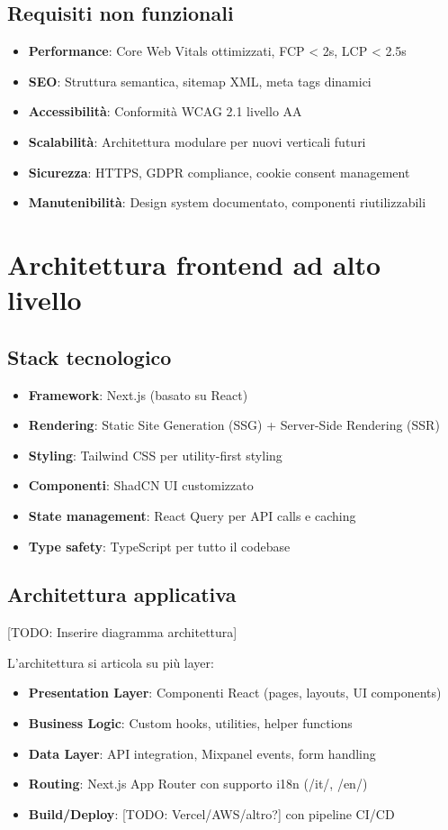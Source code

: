 \subsection{Requisiti non funzionali}
\begin{itemize}
  \item \textbf{Performance}: Core Web Vitals ottimizzati, FCP < 2s, LCP < 2.5s
  \item \textbf{SEO}: Struttura semantica, sitemap XML, meta tags dinamici
  \item \textbf{Accessibilità}: Conformità WCAG 2.1 livello AA
  \item \textbf{Scalabilità}: Architettura modulare per nuovi verticali futuri
  \item \textbf{Sicurezza}: HTTPS, GDPR compliance, cookie consent management
  \item \textbf{Manutenibilità}: Design system documentato, componenti riutilizzabili
\end{itemize}

\section{Architettura frontend ad alto livello}
\subsection{Stack tecnologico}
\begin{itemize}
  \item \textbf{Framework}: Next.js (basato su React)
  \item \textbf{Rendering}: Static Site Generation (SSG) + Server-Side Rendering (SSR)
  \item \textbf{Styling}: Tailwind CSS per utility-first styling
  \item \textbf{Componenti}: ShadCN UI customizzato
  \item \textbf{State management}: React Query per API calls e caching
  \item \textbf{Type safety}: TypeScript per tutto il codebase
\end{itemize}

\subsection{Architettura applicativa}
[TODO: Inserire diagramma architettura]

L'architettura si articola su più layer:
\begin{itemize}
  \item \textbf{Presentation Layer}: Componenti React (pages, layouts, UI components)
  \item \textbf{Business Logic}: Custom hooks, utilities, helper functions
  \item \textbf{Data Layer}: API integration, Mixpanel events, form handling
  \item \textbf{Routing}: Next.js App Router con supporto i18n (/it/, /en/)
  \item \textbf{Build/Deploy}: [TODO: Vercel/AWS/altro?] con pipeline CI/CD
\end{itemize}

